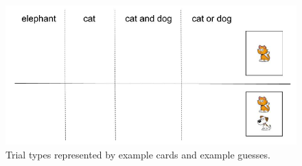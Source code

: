 \documentclass[oneside]{report}
\theoremstyle{definition}
\theoremstyle{definition}
\theoremstyle{definition}
\theoremstyle{remark}
\begin{document}
\begin{figure}[t]

{\centering \includegraphics{figs/trials-1} 

}

\caption{Trial types represented by example cards and example guesses.}\label{fig:trials}
\end{figure}
\end{document}
